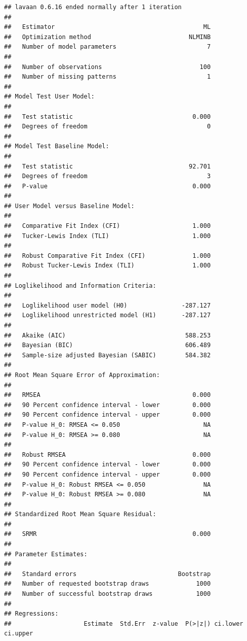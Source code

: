 \documentclass[
  11pt,
]{book}
\begin{document}
\begin{verbatim}
## lavaan 0.6.16 ended normally after 1 iteration
## 
##   Estimator                                         ML
##   Optimization method                           NLMINB
##   Number of model parameters                         7
## 
##   Number of observations                           100
##   Number of missing patterns                         1
## 
## Model Test User Model:
##                                                       
##   Test statistic                                 0.000
##   Degrees of freedom                                 0
## 
## Model Test Baseline Model:
## 
##   Test statistic                                92.701
##   Degrees of freedom                                 3
##   P-value                                        0.000
## 
## User Model versus Baseline Model:
## 
##   Comparative Fit Index (CFI)                    1.000
##   Tucker-Lewis Index (TLI)                       1.000
##                                                       
##   Robust Comparative Fit Index (CFI)             1.000
##   Robust Tucker-Lewis Index (TLI)                1.000
## 
## Loglikelihood and Information Criteria:
## 
##   Loglikelihood user model (H0)               -287.127
##   Loglikelihood unrestricted model (H1)       -287.127
##                                                       
##   Akaike (AIC)                                 588.253
##   Bayesian (BIC)                               606.489
##   Sample-size adjusted Bayesian (SABIC)        584.382
## 
## Root Mean Square Error of Approximation:
## 
##   RMSEA                                          0.000
##   90 Percent confidence interval - lower         0.000
##   90 Percent confidence interval - upper         0.000
##   P-value H_0: RMSEA <= 0.050                       NA
##   P-value H_0: RMSEA >= 0.080                       NA
##                                                       
##   Robust RMSEA                                   0.000
##   90 Percent confidence interval - lower         0.000
##   90 Percent confidence interval - upper         0.000
##   P-value H_0: Robust RMSEA <= 0.050                NA
##   P-value H_0: Robust RMSEA >= 0.080                NA
## 
## Standardized Root Mean Square Residual:
## 
##   SRMR                                           0.000
## 
## Parameter Estimates:
## 
##   Standard errors                            Bootstrap
##   Number of requested bootstrap draws             1000
##   Number of successful bootstrap draws            1000
## 
## Regressions:
##                    Estimate  Std.Err  z-value  P(>|z|) ci.lower ci.upper

\end{verbatim}
\end{document}
